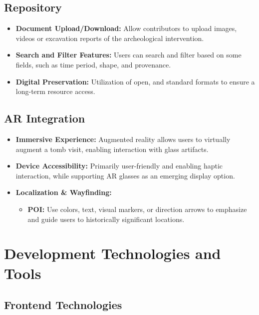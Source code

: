 \subsection*{Repository}
\begin{itemize}
    \item \textbf{Document Upload/Download:} Allow contributors to upload images, videos or excavation reports of the archeological intervention.
    \item \textbf{Search and Filter Features:} Users can search and filter based on some fields, such as time period, shape, and provenance.
    \item \textbf{Digital Preservation:} Utilization of open, and standard formats to ensure a long-term resource access.
\end{itemize}


\subsection*{\gls{AR} Integration}
\begin{itemize}
    \item \textbf{Immersive Experience:} Augmented reality allows users to virtually augment a tomb visit, enabling interaction with glass artifacts.
    \item \textbf{Device Accessibility:} Primarily user-friendly and enabling haptic interaction, while supporting \gls{AR} glasses as an emerging display option.
    \item \textbf{Localization \& Wayfinding:} 
    \begin{itemize}
        \item \textbf{\gls{POI}:} Use colors, text, visual markers, or direction arrows to emphasize and guide users to historically significant locations.
    \end{itemize}
\end{itemize}



\section{Development Technologies and Tools}
\label{sec:technologies}


\subsection{Frontend Technologies}
\label{sec:frontend}

